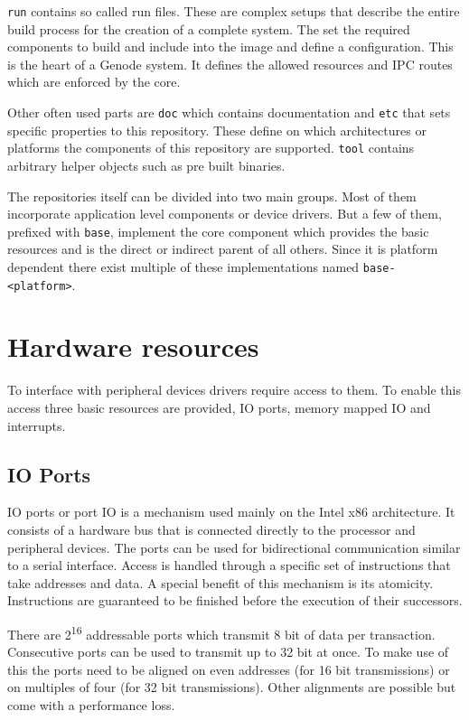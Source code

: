\documentclass[
a4paper,
11pt,
twoside
]{report}
\begin{document}
		\texttt{run} contains so called run files.
		These are complex setups that describe the entire build process for the creation of a complete system.
		The set the required components to build and include into the image and define a configuration.
		This is the heart of a Genode system.
		It defines the allowed resources and IPC routes which are enforced by the core.
		
		Other often used parts are \texttt{doc} which contains documentation and \texttt{etc} that sets specific properties to this repository.
		These define on which architectures or platforms the components of this repository are supported.
		\texttt{tool} contains arbitrary helper objects such as pre built binaries.
		
		The repositories itself can be divided into two main groups.
		Most of them incorporate application level components or device drivers.
		But a few of them, prefixed with \texttt{base}, implement the core component which provides the basic resources and is the direct or indirect parent of all others.
		Since it is platform dependent there exist multiple of these implementations named \texttt{base-<platform>}. \citep{genode}
		
		\section{Hardware resources}
		\label{hwres}
		
		To interface with peripheral devices drivers require access to them.
		To enable this access three basic resources are provided, IO ports, memory mapped IO and interrupts.
		
		\subsection{IO Ports}
		
		IO ports or port IO is a mechanism used mainly on the Intel x86 architecture.
		It consists of a hardware bus that is connected directly to the processor and peripheral devices.
		The ports can be used for bidirectional communication similar to a serial interface.
		Access is handled through a specific set of instructions that take addresses and data.
		A special benefit of this mechanism is its atomicity.
		Instructions are guaranteed to be finished before the execution of their successors.
		
		There are 2\textsuperscript{16} addressable ports which transmit 8 bit of data per transaction.
		Consecutive ports can be used to transmit up to 32 bit at once.
		To make use of this the ports need to be aligned on even addresses (for 16 bit transmissions) or on multiples of four (for 32 bit transmissions).
		Other alignments are possible but come with a performance loss.
		
\end{document}
